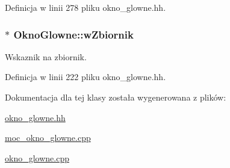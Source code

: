 Definicja w linii 278 pliku okno\-\_\-glowne.\-hh.

\hypertarget{class_okno_glowne_af2d1275209898ebdd5ab9de8ef78dffd}{
\subsubsection[{w\-Zbiornik}]{$\ast$ Okno\-Glowne\-::w\-Zbiornik\hspace{0.3cm}{\ttfamily [private]}}}\label{class_okno_glowne_af2d1275209898ebdd5ab9de8ef78dffd}
Wskaznik na zbiornik. 

Definicja w linii 222 pliku okno\-\_\-glowne.\-hh.



Dokumentacja dla tej klasy została wygenerowana z plików\-:\begin{DoxyCompactItemize}
\item 
\hyperlink{okno__glowne_8hh}{okno\-\_\-glowne.\-hh}\item 
\hyperlink{moc__okno__glowne_8cpp}{moc\-\_\-okno\-\_\-glowne.\-cpp}\item 
\hyperlink{okno__glowne_8cpp}{okno\-\_\-glowne.\-cpp}\end{DoxyCompactItemize}
